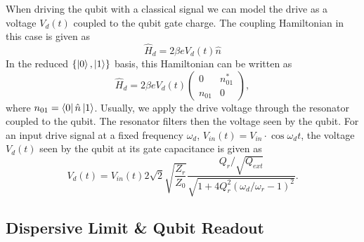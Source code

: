 When driving the qubit with a classical signal we can model the drive as a voltage $V_d(t)$ coupled to the qubit gate charge. The coupling Hamiltonian in this case is given as
%
\begin{equation}
\hat{H}_d = 2\beta e V_d(t) \hat{n}
\end{equation}
%
In the reduced $\{\left| 0 \right>,\left| 1 \right>\}$ basis, this Hamiltonian can be written as
%
\begin{equation}
\hat{H}_d = 2\beta e V_d(t)\left(\begin{array}{cc} 0 & n_{01}^* \\ n_{01} & 0 \end{array}\right), \label{eq:drive_hamiltonian}
\end{equation}
%
where $n_{01} = \left< 0 \right|\hat{n}\left| 1 \right>$. Usually, we apply the drive voltage through the resonator coupled to the qubit. The resonator filters then the voltage seen by the qubit. For an input drive signal at a fixed frequency $\omega_d$, $V_{in}(t)=V_{in}\cdot\cos{\omega_d t}$, the voltage $V_d(t)$ seen by the qubit at its gate capacitance is given as
%
\begin{equation}
V_{d}(t) = V_{in}(t) 2 \sqrt{2}\sqrt{\frac{Z_{r}}{Z_0}}\frac{Q_{r}/\sqrt{Q_{ext}}}{\sqrt{1+4Q_{r}^2(\omega_d/\omega_r-1)^2}}. \label{eq:qubit_drive_voltage}
\end{equation}
%

\subsection{Dispersive Limit \& Qubit Readout}


